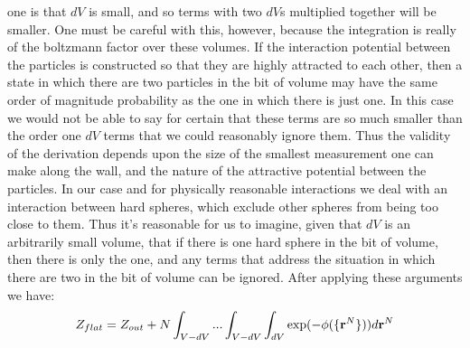 one is that $dV$ is small, and so terms with two $dV$s multiplied
together will be smaller.  One must be careful with this, however,
because the integration is really of the boltzmann factor over these
volumes.  If the interaction potential between the particles is
constructed so that they are highly attracted to each other, then a
state in which there are two particles in the bit of volume may have
the same order of magnitude probability as the one in which there is
just one.  In this case we would not be able to say for certain that
these terms are so much smaller than the order one $dV$ terms that we
could reasonably ignore them. Thus the validity of the derivation
depends upon the size of the smallest measurement one can make along
the wall, and the nature of the attractive potential between the
particles.  In our case and for physically reasonable interactions we
deal with an interaction between hard spheres, which exclude other
spheres from being too close to them.  Thus it's reasonable for us to
imagine, given that $dV$ is an arbitrarily small volume, that if there
is one hard sphere in the bit of volume, then there is only the one,
and any terms that address the situation in which there are two in the
bit of volume can be ignored.  After applying these arguments we have:
\begin{align}
  \label{eq:zflat}
  Z_{flat} = Z_{out} + N \int_{V-dV}... \int_{V-dV} \int_{dV} \exp(-\phi (\{ \textbf{r}^N \}))d\textbf{r}^N
\end{align}

